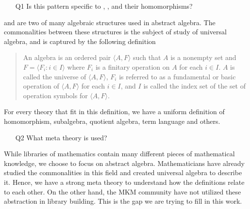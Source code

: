 \begin{itemize}
\item[Q1] Is this pattern specific to , , and their homomorphisms? 
\end{itemize}    
 and  are two of many algebraic structures used in abstract algebra. The commonalities between these structures is the subject of study of universal algebra, and is captured by the following definition~\cite{mckenzie1987algebras}
\begin{quote}
    An algebra is an ordered pair $\langle A, F \rangle$ such that $A$ is a nonempty set and $F = \langle F_i : i \in I \rangle$ where $F_i$ is a finitary operation on $A$ for each $i \in I$. $A$ is called the universe of $\langle A, F \rangle$, $F_i$ is referred to as a fundamental or basic operation of $\langle A, F \rangle$ for each $i \in I$, and $I$ is called the index set of the set of operation symbols for $\langle A, F \rangle$. 
\end{quote}

For every theory that fit in this definition, we have a uniform definition of homomorphism, subalgebra, quotient algebra, term language and others. 

\begin{itemize}
    \item[Q2] What meta theory is used? 
\end{itemize}
While libraries of mathematics contain many different pieces of mathematical knowledge, we choose to focus on abstract algebra. Mathematicians have already studied the commonalities in this field and created universal algebra to describe it. Hence, we have a strong meta theory to understand how the definitions relate to each other. On the other hand, the MKM community have not utilized these abstraction in library building. This is the gap we are trying to fill in this work.  

